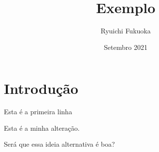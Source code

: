 \documentclass{article}
\title{Exemplo}
\author{Ryuichi Fukuoka}
\date{Setembro 2021}
\begin{document}
\maketitle

\section{Introdução}

\indent

Esta é a primeira linha

Esta é a minha alteração.

Será que essa ideia alternativa é boa?
\end{document}
